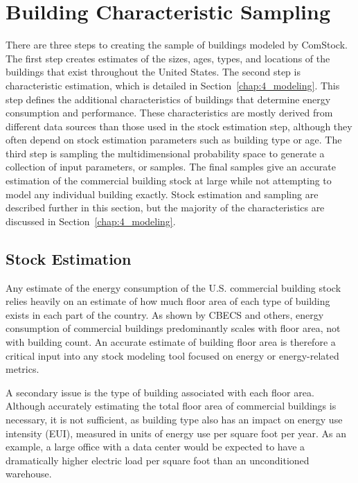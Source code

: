 \chapter{Building Characteristic Sampling}

There are three steps to creating the sample of buildings modeled by ComStock. The first step creates estimates of the sizes, ages, types, and locations of the buildings that exist throughout the United States. The second step is characteristic estimation, which is detailed in Section~\ref{chap:4_modeling}. This step defines the additional characteristics of buildings that determine energy consumption and performance. These characteristics are mostly derived from different data sources than those used in the stock estimation step, although they often depend on stock estimation parameters such as building type or age. The third step is sampling the multidimensional probability space to generate a collection of input parameters, or samples. The final samples give an accurate estimation of the commercial building stock at large while not attempting to model any individual building exactly. Stock estimation and sampling are described further in this section, but the majority of the characteristics are discussed in Section~\ref{chap:4_modeling}.

\section{Stock Estimation}

Any estimate of the energy consumption of the U.S. commercial building stock relies heavily on an estimate of how much floor area of each type of building exists in each part of the country. As shown by CBECS \citep{eia2018cbecs} and others, energy consumption of commercial buildings predominantly scales with floor area, not with building count. An accurate estimate of building floor area is therefore a critical input into any stock modeling tool focused on energy or energy-related metrics.

A secondary issue is the type of building associated with each floor area. Although accurately estimating the total floor area of commercial buildings is necessary, it is not sufficient, as building type also has an impact on energy use intensity (EUI), measured in units of energy use per square foot per year. As an example, a large office with a data center would be expected to have a dramatically higher electric load per square foot than an unconditioned warehouse.

